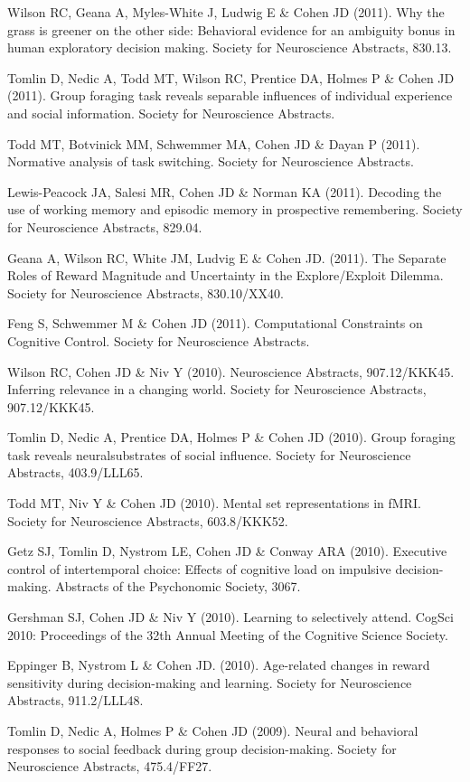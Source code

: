 \documentclass[10 pt]{article}
\begin{document}
Wilson RC, Geana A, Myles-White J, Ludwig E \& Cohen JD (2011). Why the grass is greener on the other side: Behavioral evidence for an ambiguity bonus in human exploratory decision making. Society for Neuroscience Abstracts, 830.13.

Tomlin D, Nedic A, Todd MT, Wilson RC, Prentice DA, Holmes P \& Cohen JD (2011). Group foraging task reveals separable influences of individual experience and social information. Society for Neuroscience Abstracts.

Todd MT, Botvinick MM, Schwemmer MA, Cohen JD \& Dayan P (2011). Normative analysis of task switching. Society for Neuroscience Abstracts.

Lewis-Peacock JA, Salesi MR, Cohen JD \& Norman KA (2011). Decoding the use of working memory and episodic memory in prospective remembering. Society for Neuroscience Abstracts, 829.04.

Geana A, Wilson RC, White JM, Ludvig E \& Cohen JD. (2011). The Separate Roles of Reward Magnitude and Uncertainty in the Explore/Exploit Dilemma. Society for Neuroscience Abstracts, 830.10/XX40.

Feng S, Schwemmer M \& Cohen JD (2011). Computational Constraints on Cognitive Control. Society for Neuroscience Abstracts.

Wilson RC, Cohen JD \& Niv Y (2010). Neuroscience Abstracts, 907.12/KKK45. Inferring relevance in a changing world. Society for Neuroscience Abstracts, 907.12/KKK45.

Tomlin D, Nedic A, Prentice DA, Holmes P \& Cohen JD (2010). Group foraging task reveals neuralsubstrates of social influence. Society for Neuroscience Abstracts, 403.9/LLL65.

Todd MT, Niv Y \& Cohen JD (2010). Mental set representations in fMRI. Society for Neuroscience Abstracts, 603.8/KKK52.

Getz SJ, Tomlin D, Nystrom LE, Cohen JD \& Conway ARA (2010). Executive control of intertemporal choice: Effects of cognitive load on impulsive decision-making. Abstracts of the Psychonomic Society, 3067.

Gershman SJ, Cohen JD \& Niv Y (2010). Learning to selectively attend. CogSci 2010: Proceedings of the 32th Annual Meeting of the Cognitive Science Society.

Eppinger B, Nystrom L \& Cohen JD. (2010). Age-related changes in reward sensitivity during decision-making and learning. Society for Neuroscience Abstracts, 911.2/LLL48.

Tomlin D, Nedic A, Holmes P \& Cohen JD (2009). Neural and behavioral responses to social feedback during group decision-making. Society for Neuroscience Abstracts, 475.4/FF27.
\end{document}
